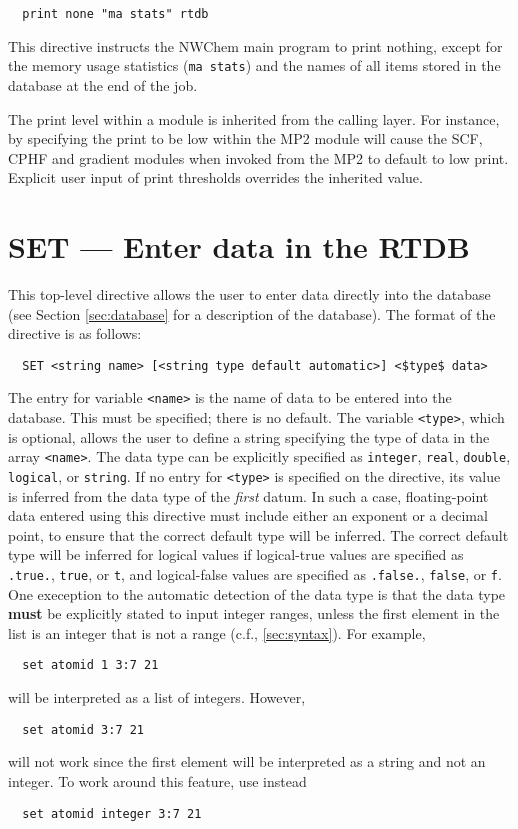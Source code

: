 \begin{verbatim}
  print none "ma stats" rtdb
\end{verbatim}

This directive instructs the NWChem main program to print nothing,
except for the memory usage statistics (\verb+ma stats+) and
the names of all items stored in the database at the end of the job.

The print level within a module is inherited from the 
calling layer.  For instance, by specifying the print to be low
within the MP2 module will cause the SCF, CPHF and gradient modules
when invoked from the MP2 to default to low print.  Explicit user
input of print thresholds overrides the inherited value.

\section{SET --- Enter data in the RTDB}
\label{sec:set}

This top-level directive allows the user to enter data directly into the
database (see Section \ref{sec:database} for a description of the database).
The format of the directive is as follows:

\begin{verbatim}
  SET <string name> [<string type default automatic>] <$type$ data>
\end{verbatim}

The entry for variable \verb+<name>+ is the name of 
data to be entered into the database.  This must be specified; there is no default.  The variable \verb+<type>+, which is
optional, allows the user to define a string specifying the type of
data in the array \verb+<name>+.  The data type can be explicitly
specified as \verb+integer+, \verb+real+, \verb+double+,
\verb+logical+, or \verb+string+.  If no entry for \verb+<type>+ is
specified on the directive, its value is inferred from the data type
of the {\em first} datum.  In such a case, floating-point data
entered using this directive must include either an exponent or a
decimal point, to ensure that the correct default type will be
inferred.  The correct default type will be inferred for logical
values if logical-true values are specified as \verb+.true.+,
\verb+true+, or \verb+t+, and logical-false values are specified as
\verb+.false.+, \verb+false+, or \verb+f+.  One exeception to the
automatic detection of the data type is that the data type {\bf must}
be explicitly stated to input integer ranges, unless the first
element in the list is an integer that is not a range (c.f.,
\ref{sec:syntax}).  For example,
\begin{verbatim}
  set atomid 1 3:7 21
\end{verbatim}
will be interpreted as a list of integers.  However, 
\begin{verbatim}
  set atomid 3:7 21
\end{verbatim}
will not work since the first element will be interpreted as a
string and not an integer.  To work around this feature, use instead
\begin{verbatim}
  set atomid integer 3:7 21
\end{verbatim}


